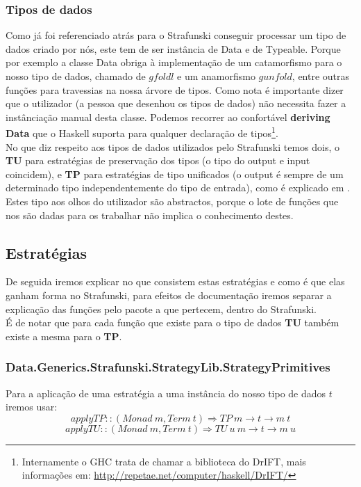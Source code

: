 \subsubsection{Tipos de dados}
Como já foi referenciado atrás para o Strafunski conseguir processar um tipo de dados criado por nós, este tem de ser instância de Data e de Typeable.
Porque por exemplo a classe Data obriga à implementação de um catamorfismo para o nosso tipo de dados, chamado de $gfoldl$ e um anamorfismo $gunfold$, entre outras
funções para travessias na nossa árvore de tipos. Como nota é importante dizer que o utilizador (a pessoa que desenhou os tipos de dados) não necessita
fazer a instânciação manual desta classe. Podemos recorrer ao confortável \textbf{deriving Data} que o Haskell suporta para qualquer declaração
de tipos\footnote{Internamente o GHC trata de chamar a biblioteca do DrIFT, mais informações em: \url{http://repetae.net/computer/haskell/DrIFT/}}.\\

No que diz respeito aos tipos de dados utilizados pelo Strafunski temos dois, o \textbf{TU} para estratégias de preservação dos tipos
(o tipo do output e input coincidem), e \textbf{TP} para estratégias de tipo unificados (o output é sempre de um determinado tipo independentemente do tipo de entrada),
como é explicado em \cite{Lammel:2002:DPF:570186.570187}.\\
Estes tipo aos olhos do utilizador são abstractos, porque o lote de funções que nos são dadas para os trabalhar não implica o conhecimento destes.

\subsection{Estratégias}
De seguida iremos explicar no que consistem estas estratégias e como é que elas ganham forma no Strafunski, para efeitos de documentação iremos separar a explicação
das funções pelo pacote a que pertecem, dentro do Strafunski.\\
É de notar que para cada função que existe para o tipo de dados \textbf{TU} também existe a mesma para o \textbf{TP}.

\subsubsection{Data.Generics.Strafunski.StrategyLib.StrategyPrimitives}

Para a aplicação de uma estratégia a uma instância do nosso tipo de dados $t$ iremos usar:
$$applyTP :: (Monad~m, Term~t) \Rightarrow TP~m \rightarrow t \rightarrow m~t$$
$$applyTU :: (Monad~m, Term~t) \Rightarrow TU~u~m \rightarrow t \rightarrow m~u$$

